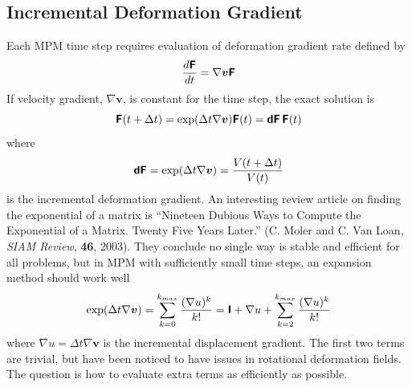 \documentclass[11pt]{article}
\renewcommand{\vec}[1]{\boldsymbol{#1}}
\newcommand{\tens}[1]{\boldsymbol{\mathsf{#1}}}
\begin{document}
\subsection{Incremental Deformation Gradient}

Each MPM time step requires evaluation of deformation gradient rate defined by
\begin{equation}
    {d\tens F\over dt} = \nabla\vec v \tens F
\end{equation}
If velocity gradient, $\nabla \vec v$, is constant for the time step, the exact solution is
\begin{equation}
    \tens F(t+\Delta t) = \exp(\Delta t \nabla\vec v)\tens F(t) = \tens{dF} \thinspace \tens F(t)
\end{equation}
where
\begin{equation}
        \tens{dF} = \exp(\Delta t \nabla\vec v)= {V(t+\Delta t)\over V(t)}
\end{equation}
is the incremental deformation gradient. An interesting review article on finding the exponential of a matrix is  ``Nineteen Dubious Ways to Compute the Exponential of a Matrix. Twenty Five Years Later.'' (C. Moler and C. Van Loan, {\em SIAM Review}, {\bf 46}, 2003). They conclude no single way is stable and efficient for all problems, but in MPM with sufficiently small time steps, an expansion method should work well
\begin{equation}
    \exp(\Delta t \nabla\vec v) = \sum_{k=0}^{k_{max}} {(\nabla u)^k \over k!} 
            = \tens I + \nabla u + \sum_{k=2}^{k_{max}} {(\nabla u)^k \over k!}
\end{equation}
where $\nabla u = \Delta t \nabla\vec v$ is the incremental displacement gradient. The first two terms are trivial, but have been noticed to have issues in rotational deformation fields. The question is how to evaluate extra terms as efficiently as possible.
\end{document}
